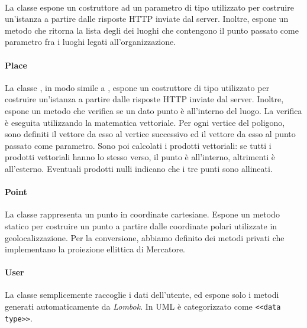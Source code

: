 \documentclass[../../manuale-manutentore.tex]{subfiles}
\begin{document}
\paragraph[Organization]{}%
\label{par:organization}

La classe  espone un costruttore ad un parametro di tipo  utilizzato per costruire un'istanza a partire dalle risposte HTTP inviate dal server.
Inoltre, espone un metodo  che ritorna la lista degli  dei luoghi che contengono il punto passato come parametro fra i luoghi legati all'organizzazione.

\paragraph[Place]{Place}%
\label{par:place}

La classe , in modo simile a , espone un costruttore di tipo  utilizzato per costruire un'istanza a partire dalle risposte HTTP inviate dal server.
Inoltre, espone un metodo  che verifica se un dato punto è all'interno del luogo.
La verifica è eseguita utilizzando la matematica vettoriale.
Per ogni vertice del poligono, sono definiti il vettore da esso al vertice successivo ed il vettore da esso al punto passato come parametro.
Sono poi calcolati i prodotti vettoriali: se tutti i prodotti vettoriali hanno lo stesso verso, il punto è all'interno, altrimenti è all'esterno.
Eventuali prodotti nulli indicano che i tre punti sono allineati.

\paragraph[Point]{Point}%
\label{par:point}

La classe  rappresenta un punto in coordinate cartesiane.
Espone un metodo statico \linebreak{} per costruire un punto a partire dalle coordinate polari utilizzate in geolocalizzazione.
Per la conversione, abbiamo definito dei metodi privati che implementano la proiezione ellittica di Mercatore.

\paragraph[User]{User}%
\label{par:user}

La classe  semplicemente raccoglie i dati dell'utente, ed espone solo i metodi generati automaticamente da \textit{Lombok}.
In UML è categorizzato come \texttt{<<data type>>}.
\end{document}
